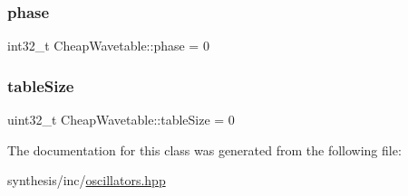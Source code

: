 \mbox{\label{class_cheap_wavetable_a3a71b0825ae52d4138f43565019749b0}} 
\subsubsection{\texorpdfstring{phase}{phase}}
{\footnotesize\ttfamily int32\+\_\+t Cheap\+Wavetable\+::phase = 0}

\mbox{\label{class_cheap_wavetable_ad2a8b3e71070f39921daec92e611769f}} 
\subsubsection{\texorpdfstring{table\+Size}{tableSize}}
{\footnotesize\ttfamily uint32\+\_\+t Cheap\+Wavetable\+::table\+Size = 0}



The documentation for this class was generated from the following file\+:\begin{DoxyCompactItemize}
\item 
synthesis/inc/\mbox{\hyperlink{oscillators_8hpp}{oscillators.\+hpp}}\end{DoxyCompactItemize}
